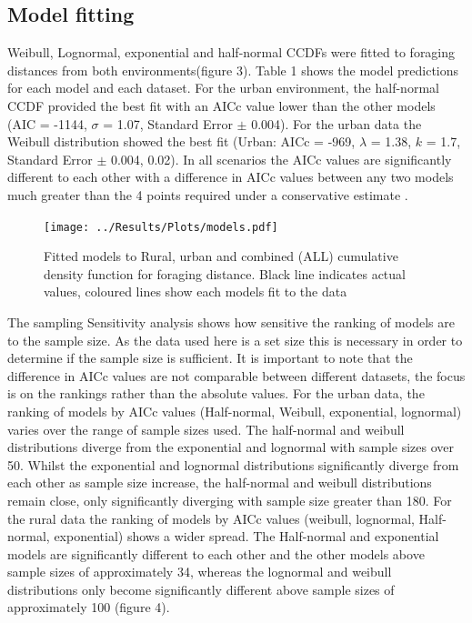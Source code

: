 \documentclass[11pt]{article}
\begin{document}
\begin{linenumbers}
\subsection{Model fitting}
Weibull, Lognormal, exponential and half-normal CCDFs were fitted to foraging distances from both environments(figure 3). Table 1 shows the model predictions for each model and each dataset. For the urban environment, the half-normal CCDF provided the best fit with an AICc value lower than the other models (AIC = -1144, $\sigma$ = 1.07, Standard Error $\pm$ 0.004). For the urban data the Weibull distribution showed the best fit (Urban: AICc = -969, $\lambda$ = 1.38, $k$ = 1.7, Standard Error $\pm$ 0.004, 0.02). In all scenarios the AICc values are significantly different to each other with a difference in AICc values between any two models much greater than the 4 points required under a conservative estimate \citep{Burnham2004}. \\[1cm]



\begin{figure}[H]
	\texttt{[image: ../Results/Plots/models.pdf]}
	\caption{ Fitted models to Rural, urban and combined (ALL) cumulative density function for foraging distance. Black line indicates actual values, coloured lines show each models fit to the data}
\end{figure}

The sampling Sensitivity analysis shows how sensitive the ranking of models are to the sample size. As the data used here is a set size this is necessary in order to determine if the sample size is sufficient. It is important to note that the difference in AICc values are not comparable between different datasets, the focus is on the rankings rather than the absolute values. For the urban data, the ranking of models by AICc values (Half-normal, Weibull, exponential, lognormal) varies over the range of sample sizes used. The half-normal and weibull distributions diverge from the exponential and lognormal with sample sizes over 50. Whilst the exponential and lognormal distributions significantly diverge from each other as sample size increase, the half-normal and weibull distributions remain close, only significantly diverging with sample size greater than 180. For the rural data the ranking of models by AICc values (weibull, lognormal, Half-normal, exponential) shows a wider spread. The Half-normal and exponential models are significantly different to each other and the other models above sample sizes of approximately 34, whereas the lognormal and weibull distributions only become significantly different above sample sizes of approximately 100 (figure 4). \par


\end{linenumbers}
\end{document}
